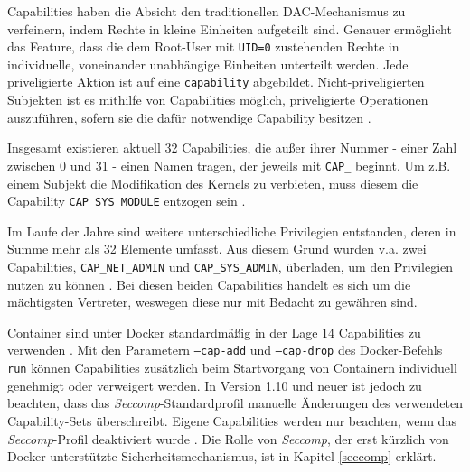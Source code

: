 \documentclass[../main.tex]{subfiles}
\begin{document}
			Capabilities haben die Absicht den traditionellen DAC-Mechanismus zu verfeinern, indem Rechte in kleine Einheiten aufgeteilt sind. Genauer ermöglicht das Feature, dass die dem Root-User mit \texttt{UID=0} zustehenden Rechte in individuelle, voneinander unabhängige Einheiten unterteilt werden. Jede priveligierte Aktion ist auf eine \texttt{capability} abgebildet. Nicht-priveligierten Subjekten ist es mithilfe von Capabilities möglich, priveligierte Operationen auszuführen, sofern sie die dafür notwendige Capability besitzen \cite[S.33]{linuxInterface}\cite[S.39]{SELinuxApparmor}.

			Insgesamt existieren aktuell 32 Capabilities, die außer ihrer Nummer - einer Zahl zwischen 0 und 31 - einen Namen tragen, der jeweils mit \texttt{CAP\_} beginnt. Um z.B. einem Subjekt die Modifikation des Kernels zu verbieten, muss diesem die Capability \texttt{CAP\_SYS\_MODULE} entzogen sein \cite[S.42]{SELinuxApparmor}.

			Im Laufe der Jahre sind weitere unterschiedliche Privilegien entstanden, deren in Summe mehr als 32 Elemente umfasst. Aus diesem Grund wurden v.a. zwei Capabilities, \texttt{CAP\_NET\_ADMIN} und \texttt{CAP\_SYS\_ADMIN}, überladen, um den Privilegien nutzen zu können \cite[S.40f.]{SELinuxApparmor}. Bei diesen beiden Capabilities handelt es sich um die mächtigsten Vertreter, weswegen diese nur mit Bedacht zu gewähren sind.

			Container sind unter Docker standardmäßig in der Lage 14 Capabilities zu verwenden \cite{githubCapabilities}. Mit den Parametern \texttt{--cap-add} und \texttt{--cap-drop} des Docker-Befehls \texttt{run} können Capabilities zusätzlich beim Startvorgang von Containern individuell genehmigt oder verweigert werden. In Version 1.10 und neuer ist jedoch zu beachten, dass das \emph{Seccomp}-Standardprofil manuelle Änderungen des verwendeten Capability-Sets überschreibt. Eigene Capabilities werden nur beachten, wenn das \emph{Seccomp}-Profil deaktiviert wurde \cite{dockerRun}. Die Rolle von \emph{Seccomp}, der erst kürzlich von Docker unterstützte Sicherheitsmechanismus, ist in Kapitel \ref{seccomp} erklärt.



\end{document}
